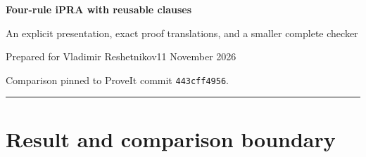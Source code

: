 \documentclass[11pt]{article}
\theoremstyle{definition}
\newcommand{\RR}{\mathcal R}
\newcommand{\SelectedBytes}{2282}
\newcommand{\SelectedTokens}{666}
\newcommand{\SelectedAST}{770}
\begin{document}
\thispagestyle{empty}
{\Large\bfseries\color{ink} Four-rule iPRA with reusable clauses}\par
\vspace{0.4em}
{\large An explicit presentation, exact proof translations, and a smaller complete checker}\par
\vspace{0.8em}
Prepared for Vladimir Reshetnikov\hfill 11 November 2026\par
\textcolor{muted}{Comparison pinned to ProveIt commit \texttt{443cff4956}.}\par
\vspace{0.7em}\hrule\vspace{0.8em}

\begin{abstract}
We give an incremental simplification of the current ConciseIPRA presentation.
One fixed reusable clause, $\RR=[\,\,;y.(y=y)]$, and four inference schemes
--- Use, Step, Open, and Close --- present a theory bi-interpretable and
equiconsistent with full first-order intuitionistic primitive recursive
arithmetic. Universal reflexivity, ordinary hypotheses, and conditional
closures all use the same clause mechanism. Numerical terms are zero-normal
scalar iterators; all normalization is included in the checker.

We prove exact translations to and from the repository's five-pattern
zero-normal clause calculus, recover its arithmetic and logical interface,
and make both interpretation composites explicit. A complete standalone
Python checker, bidirectional certificate translators, negative controls,
and reproducible source measurements accompany the paper. The selected
checker has \SelectedBytes\ normalized bytes, \SelectedTokens\ significant
tokens, and \SelectedAST\ AST nodes, compared with $2950/829/902$ for the
pinned transparent five-pattern checker. The comparison includes parsing,
syntax and scope validation, hereditary substitution, all rules, and the
acceptance interface.

The improvement is a presentation and implementation reduction. Reflexivity
remains a counted axiom clause. No new minimum over the repository's compact
codecs, no absolute minimality theorem, and no new Lean verification are claimed.
\end{abstract}

\section{Result and comparison boundary}
\label{sec:main-result}
\end{document}
